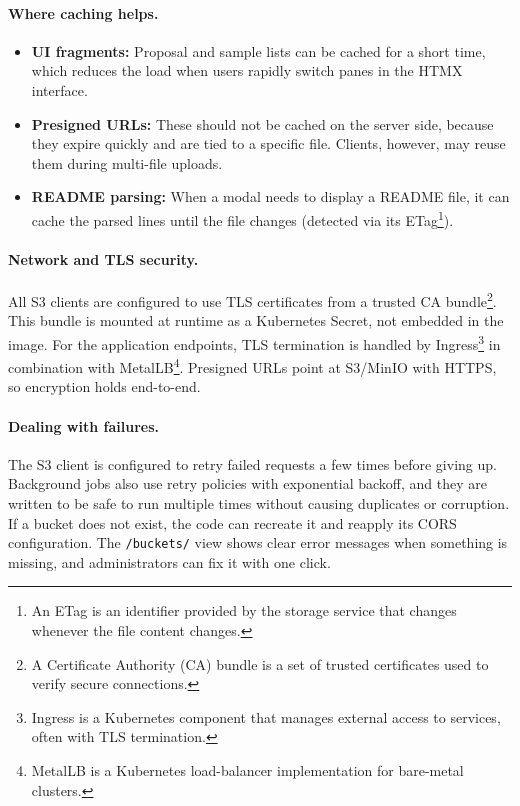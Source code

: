 \paragraph{Where caching helps.}
\begin{itemize}
	\item \textbf{UI fragments:} Proposal and sample lists can be cached for a short time, which reduces the load when users rapidly switch panes in the HTMX interface.  
	\item \textbf{Presigned URLs:} These should not be cached on the server side, because they expire quickly and are tied to a specific file.  
	Clients, however, may reuse them during multi-file uploads.  
	\item \textbf{README parsing:} When a modal needs to display a README file, it can cache the parsed lines until the file changes (detected via its ETag\footnote{An ETag is an identifier provided by the storage service that changes whenever the file content changes.}).  
\end{itemize}

\paragraph{Network and TLS security.}
All S3 clients are configured to use TLS certificates from a trusted CA bundle\footnote{A Certificate Authority (CA) bundle is a set of trusted certificates used to verify secure connections.}.  
This bundle is mounted at runtime as a Kubernetes Secret, not embedded in the image.  
For the application endpoints, TLS termination is handled by Ingress\footnote{Ingress is a Kubernetes component that manages external access to services, often with TLS termination.} in combination with MetalLB\footnote{MetalLB is a Kubernetes load-balancer implementation for bare-metal clusters.}.  
Presigned URLs point at S3/MinIO with HTTPS, so encryption holds end-to-end.

\paragraph{Dealing with failures.}
The S3 client is configured to retry failed requests a few times before giving up.  
Background jobs also use retry policies with exponential backoff, and they are written to be safe to run multiple times without causing duplicates or corruption.  
If a bucket does not exist, the code can recreate it and reapply its CORS configuration.  
The \texttt{/buckets/} view shows clear error messages when something is missing, and administrators can fix it with one click.

